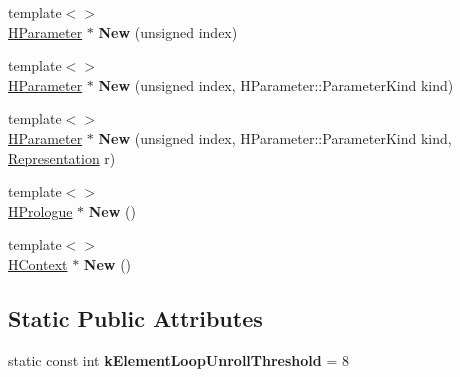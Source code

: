 \begin{DoxyCompactItemize}
\item 
{\footnotesize template$<$$>$ }\\\hyperlink{classv8_1_1internal_1_1_h_parameter}{H\+Parameter} $\ast$ {\bfseries New} (unsigned index)\hypertarget{classv8_1_1internal_1_1_h_graph_builder_a7b904e1c50e4077549b31caafb4a0856}{}\label{classv8_1_1internal_1_1_h_graph_builder_a7b904e1c50e4077549b31caafb4a0856}

\item 
{\footnotesize template$<$$>$ }\\\hyperlink{classv8_1_1internal_1_1_h_parameter}{H\+Parameter} $\ast$ {\bfseries New} (unsigned index, H\+Parameter\+::\+Parameter\+Kind kind)\hypertarget{classv8_1_1internal_1_1_h_graph_builder_ab47441c2485cc38e0c2f053c67d9940b}{}\label{classv8_1_1internal_1_1_h_graph_builder_ab47441c2485cc38e0c2f053c67d9940b}

\item 
{\footnotesize template$<$$>$ }\\\hyperlink{classv8_1_1internal_1_1_h_parameter}{H\+Parameter} $\ast$ {\bfseries New} (unsigned index, H\+Parameter\+::\+Parameter\+Kind kind, \hyperlink{classv8_1_1internal_1_1_representation}{Representation} r)\hypertarget{classv8_1_1internal_1_1_h_graph_builder_a524974f2ae7b4bec1c0699a5d59fae6b}{}\label{classv8_1_1internal_1_1_h_graph_builder_a524974f2ae7b4bec1c0699a5d59fae6b}

\item 
{\footnotesize template$<$$>$ }\\\hyperlink{classv8_1_1internal_1_1_h_prologue}{H\+Prologue} $\ast$ {\bfseries New} ()\hypertarget{classv8_1_1internal_1_1_h_graph_builder_a432d48406d1467452568eef3f66943d8}{}\label{classv8_1_1internal_1_1_h_graph_builder_a432d48406d1467452568eef3f66943d8}

\item 
{\footnotesize template$<$$>$ }\\\hyperlink{classv8_1_1internal_1_1_h_context}{H\+Context} $\ast$ {\bfseries New} ()\hypertarget{classv8_1_1internal_1_1_h_graph_builder_ac8364a11e55f6e0ad3bbfbf306ff25b9}{}\label{classv8_1_1internal_1_1_h_graph_builder_ac8364a11e55f6e0ad3bbfbf306ff25b9}

\end{DoxyCompactItemize}
\subsection*{Static Public Attributes}
\begin{DoxyCompactItemize}
\item 
static const int {\bfseries k\+Element\+Loop\+Unroll\+Threshold} = 8\hypertarget{classv8_1_1internal_1_1_h_graph_builder_a2b5563939eadafc67bca2eb265e8bbac}{}\label{classv8_1_1internal_1_1_h_graph_builder_a2b5563939eadafc67bca2eb265e8bbac}

\end{DoxyCompactItemize}
